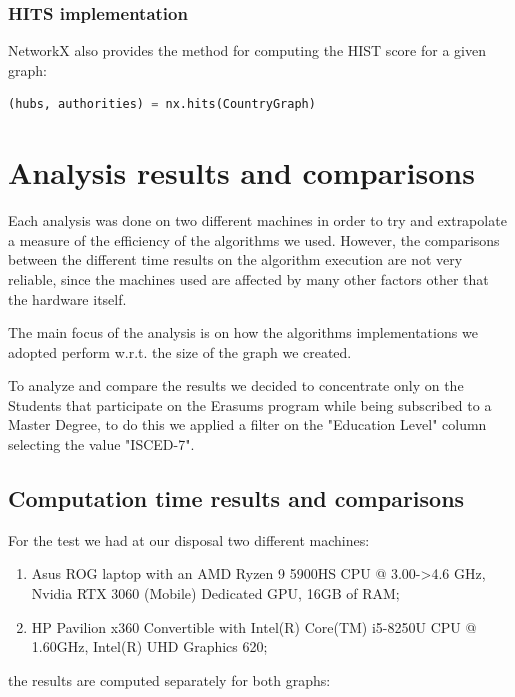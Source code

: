    \subsubsection*{HITS implementation}
    NetworkX also provides the method for computing the HIST score for a given graph:
    \begin{lstlisting}[language=python]
      (hubs, authorities) = nx.hits(CountryGraph)
    \end{lstlisting}

    \section{Analysis results and comparisons}
    Each analysis was done on two different machines in order to try and extrapolate a measure of the efficiency of the algorithms we used. 
    However, the comparisons between the different time results on the algorithm execution are not very reliable, since the machines used
    are affected by many other factors other that the hardware itself. 

    The main focus of the analysis is on how the algorithms implementations we adopted perform w.r.t. the size of the graph we created.

    To analyze and compare the results we decided to concentrate only on the Students that participate on the Erasums program while being
    subscribed to a Master Degree, to do this we applied a filter on the "Education Level" column selecting the value "ISCED-7".
    \subsection*{Computation time results and comparisons}
    For the test we had at our disposal two different machines:
    \begin{enumerate}
      \item Asus ROG laptop with an AMD Ryzen 9 5900HS CPU @ 3.00->4.6 GHz, Nvidia RTX 3060 (Mobile) Dedicated GPU, 16GB of RAM;
      \item HP Pavilion x360 Convertible with Intel(R) Core(TM) i5-8250U CPU @ 1.60GHz, Intel(R) UHD Graphics 620;
    \end{enumerate}
    the results are computed separately for both graphs:

